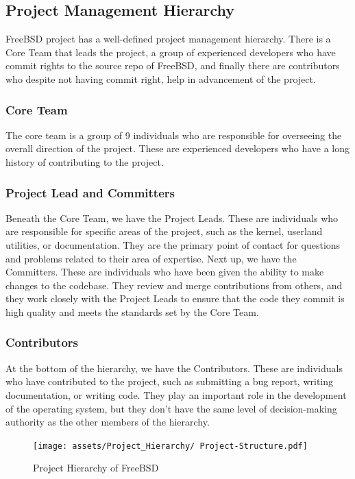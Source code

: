 \documentclass[12pt, dvipsnames, a4paper]{article}
\begin{document}
\subsection{Project Management Hierarchy}
FreeBSD project has a well-defined project management hierarchy. There is a Core Team that leads the project, a group of experienced developers who have commit rights to the source repo of FreeBSD, and finally there are contributors who despite not having commit right, help in advancement of the project. 
\subsubsection{Core Team}
The core team is a group of 9 individuals who are responsible for overseeing the overall direction of the project. These are experienced developers who have a long history of contributing to the project. 
\subsubsection{Project Lead and Committers}
Beneath the Core Team, we have the Project Leads. These are individuals who are responsible for specific areas of the project, such as the kernel, userland utilities, or documentation. They are the primary point of contact for questions and problems related to their area of expertise. Next up, we have the Committers. These are individuals who have been given the ability to make changes to the codebase. They review and merge contributions from others, and they work closely with the Project Leads to ensure that the code they commit is high quality and meets the standards set by the Core Team. 
\subsubsection{Contributors}
At the bottom of the hierarchy, we have the Contributors. These are individuals who have contributed to the project, such as submitting a bug report, writing documentation, or writing code. They play an important role in the development of the operating system, but they don't have the same level of decision-making authority as the other members of the hierarchy.
\begin{figure}[!htb]
	\advance\leftskip-0.5cm
	\texttt{[image: assets/Project\_Hierarchy/ Project-Structure.pdf]}
	\caption{Project Hierarchy of FreeBSD\cite{dev-model}}
\end{figure}
\end{document}

